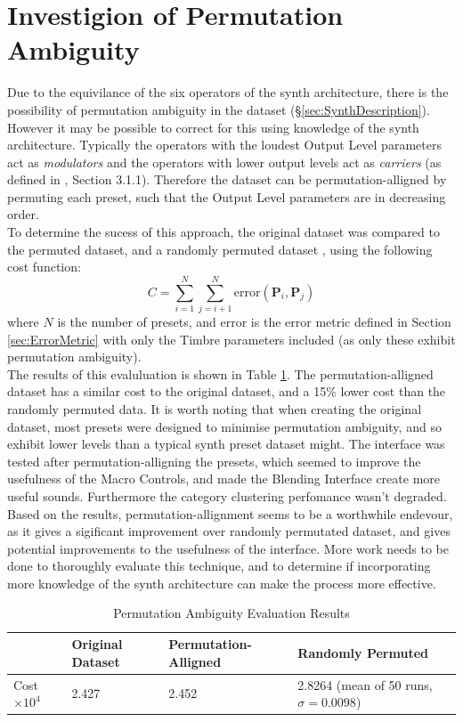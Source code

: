 \documentclass[11pt, oneside]{report}   	%
\renewcommand{\vec}[1]{\mathbf{#1}}
\begin{document}
\section{Investigion of Permutation Ambiguity}\label{sec:PermutationAmbiguity}
\vspace{-5pt}
Due to the equivilance of the six operators of the synth architecture, there is the possibility of permutation ambiguity in the dataset (\S \ref{sec:SynthDescription}). However it may be possible to correct for this using knowledge of the synth architecture. Typically the operators with the loudest Output Level parameters act as \emph{modulators} and the operators with lower output levels act as \emph{carriers} (as defined in \cite{YeeKing}, Section 3.1.1). Therefore the dataset can be permutation-alligned by permuting each preset, such that the Output Level parameters are in decreasing order.\\
To determine the sucess of this approach, the original dataset was compared to the permuted dataset, and a randomly permuted dataset , using the following cost function:
\begin{equation}
	C = \sum_{i = 1}^{N}\sum_{j = i+1}^{N}\mathrm{error}(\vec{P}_i, \vec{P}_j)
\end{equation}
where $N$ is the number of presets, and $\mathrm{error}$ is the error metric defined in Section \ref{sec:ErrorMetric} with only the Timbre parameters included (as only these exhibit permutation ambiguity).\\
The results of this evaluluation is shown in Table \ref{tab:PermutationAmbiguity}. The permutation-alligned dataset has a similar cost to the original dataset, and a 15\% lower cost than the randomly permuted data. It is worth noting that when creating the original dataset, most presets were designed to minimise permutation ambiguity, and so exhibit lower levels than a typical synth preset dataset might.  The interface was tested after permutation-alligning the presets, which seemed to improve the usefulness of the Macro Controls, and made the Blending Interface create more useful sounds. Furthermore the category clustering perfomance wasn't degraded. Based on the results, permutation-allignment seems to be a worthwhile endevour, as it gives a sigificant improvement over randomly permutated dataset, and gives potential improvements to the usefulness of the interface. More work needs to be done to thoroughly evaluate this technique, and to determine if incorporating more knowledge of the synth architecture can make the process more effective.
\begin{table}[h]
	\vspace{-20pt}
	\centering
	\begin{tabular}{l|l|l|l}
		& Original Dataset & Permutation-Alligned & Randomly Permuted \\ \hline
		Cost $\times 10^4$ & 2.427            & 2.452                 & 2.8264  (mean of 50 runs, $\sigma = 0.0098$)
	\end{tabular}
\caption{Permutation Ambiguity Evaluation Results}
\label{tab:PermutationAmbiguity}
\vspace{-20pt}
\end{table}
\end{document}
